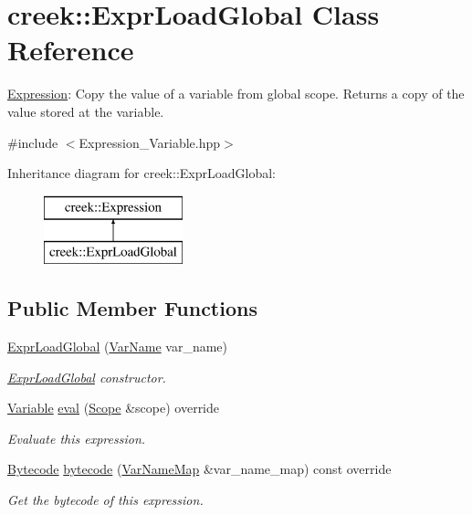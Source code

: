 \hypertarget{classcreek_1_1_expr_load_global}{}\section{creek\+:\+:Expr\+Load\+Global Class Reference}
\label{classcreek_1_1_expr_load_global}


\hyperlink{classcreek_1_1_expression}{Expression}\+: Copy the value of a variable from global scope. Returns a copy of the value stored at the variable.  




{\ttfamily \#include $<$Expression\+\_\+\+Variable.\+hpp$>$}

Inheritance diagram for creek\+:\+:Expr\+Load\+Global\+:\begin{figure}[H]
\begin{center}
\leavevmode
\includegraphics[height=2.000000cm]{classcreek_1_1_expr_load_global}
\end{center}
\end{figure}
\subsection*{Public Member Functions}
\begin{DoxyCompactItemize}
\item 
\hyperlink{classcreek_1_1_expr_load_global_a4cb7e7f1176326a7230fc10851790d54}{Expr\+Load\+Global} (\hyperlink{classcreek_1_1_var_name}{Var\+Name} var\+\_\+name)
\begin{DoxyCompactList}\small\item\em {\ttfamily \hyperlink{classcreek_1_1_expr_load_global}{Expr\+Load\+Global}} constructor. \end{DoxyCompactList}\item 
\hyperlink{classcreek_1_1_variable}{Variable} \hyperlink{classcreek_1_1_expr_load_global_a2ad646f205e977200f541208e33ebcae}{eval} (\hyperlink{classcreek_1_1_scope}{Scope} \&scope) override
\begin{DoxyCompactList}\small\item\em Evaluate this expression. \end{DoxyCompactList}\item 
\hyperlink{classcreek_1_1_bytecode}{Bytecode} \hyperlink{classcreek_1_1_expr_load_global_aece2e3e6fd09eaadb9b320c43b239102}{bytecode} (\hyperlink{classcreek_1_1_var_name_map}{Var\+Name\+Map} \&var\+\_\+name\+\_\+map) const  override\hypertarget{classcreek_1_1_expr_load_global_aece2e3e6fd09eaadb9b320c43b239102}{}\label{classcreek_1_1_expr_load_global_aece2e3e6fd09eaadb9b320c43b239102}

\begin{DoxyCompactList}\small\item\em Get the bytecode of this expression. \end{DoxyCompactList}\end{DoxyCompactItemize}


